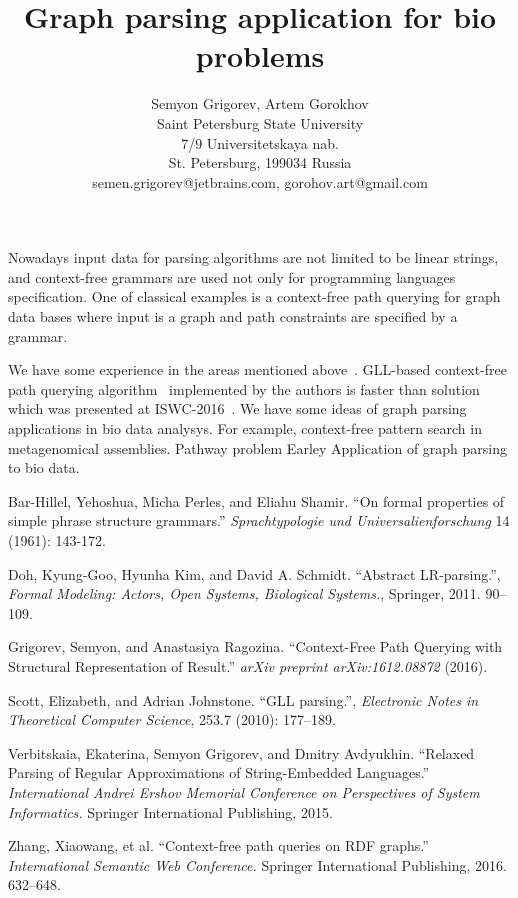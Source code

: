 \documentclass[12pt]{article}  %
\title{Graph parsing application for bio problems}
\author{Semyon Grigorev, Artem Gorokhov
\\
       {Saint Petersburg State University}\\
       {7/9 Universitetskaya nab.}\\
       {St. Petersburg, 199034 Russia}\\
       semen.grigorev@jetbrains.com, gorohov.art@gmail.com
       }
\date{}
\theoremstyle{definition}
\theoremstyle{remark}
\begin{document}
\maketitle

Nowadays input data for parsing algorithms are not limited to be linear strings, and context-free grammars are used not only for programming languages specification.
One of classical examples is a context-free path querying for graph data bases where input is a graph and path constraints are specified by a grammar.

We have some experience in the areas mentioned above~\cite{GraphGLL, RelaxedRNGLR}.
GLL-based context-free path querying algorithm~\cite{GraphGLL} implemented by the authors is faster than solution which was presented at ISWC-2016~\cite{CFRDFParsing}. 
We have some ideas of graph parsing applications in bio data analysys.
For example, context-free pattern search in metagenomical assemblies. 
Pathway problem
Earley
Application of graph parsing to bio data.

\begin{thebibliography}{9}

  Bar-Hillel, Yehoshua, Micha Perles, and Eliahu Shamir.
  ``On formal properties of simple phrase structure grammars.''
   \emph{Sprachtypologie und Universalienforschung}
   14 (1961): 143-172.

  Doh, Kyung-Goo, Hyunha Kim, and David A. Schmidt.
  ``Abstract LR-parsing.'',
  \emph{Formal Modeling: Actors, Open Systems, Biological Systems.},
  Springer,
  2011.
  90--109.

  Grigorev, Semyon, and Anastasiya Ragozina. 
  ``Context-Free Path Querying with Structural Representation of Result.''
   \emph{arXiv preprint arXiv:1612.08872}
    (2016).

  Scott, Elizabeth, and Adrian Johnstone.   
  ``GLL parsing.'',
  \emph{Electronic Notes in Theoretical Computer Science},
  253.7 (2010): 177--189.

  Verbitskaia, Ekaterina, Semyon Grigorev, and Dmitry Avdyukhin.
  ``Relaxed Parsing of Regular Approximations of String-Embedded Languages.''
  \emph{International Andrei Ershov Memorial Conference on Perspectives of System Informatics.}
  Springer International Publishing, 2015.

  Zhang, Xiaowang, et al.
  ``Context-free path queries on RDF graphs.'' 
  \emph{International Semantic Web Conference.}
   Springer International Publishing, 2016.
   632--648.

\end{thebibliography}
\end{document}
